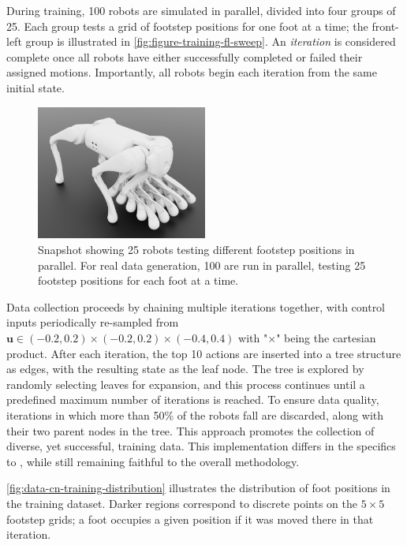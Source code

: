 During training, 100 robots are simulated in parallel, divided into
four groups of 25. Each group tests a grid of footstep positions for
one foot at a time; the front-left group is illustrated in
\autoref{fig:figure-training-fl-sweep}. An \textit{iteration} is
considered complete once all robots have either successfully
completed or failed their assigned motions. Importantly, all robots
begin each iteration from the same initial state.

\begin{figure}[H]
  \centering
  \includegraphics[width=0.5\textwidth]{images/figures/training-fl-sweep.png}
  \caption{Snapshot showing 25 robots testing different footstep
    positions in parallel. For real data generation, 100 are run in
  parallel, testing 25 footstep positions for each foot at a time.}
  \label{fig:figure-training-fl-sweep}
\end{figure}

Data collection proceeds by chaining multiple iterations together,
with control inputs periodically re-sampled from  $\mathbf u \in
(-0.2, 0.2) \times (-0.2, 0.2) \times (-0.4, 0.4)$ with "$\times$"
being the cartesian product.  After each iteration, the top 10
actions are inserted into a tree structure as edges, with the
resulting state as the leaf node. The tree is explored by randomly
selecting leaves for expansion, and this process continues until a
predefined maximum number of iterations is reached. To ensure data
quality, iterations in which more than 50\% of the robots fall are
discarded, along with their two parent nodes in the tree. This
approach promotes the collection of diverse, yet successful, training
data. This implementation differs in the specifics to
\cite{bratta_contactnet_2024}, while still remaining faithful
to the overall methodology.

\autoref{fig:data-cn-training-distribution} illustrates the
distribution of foot positions in the training dataset. Darker
regions correspond to discrete points on the $5 \times 5$ footstep
grids; a foot occupies a given position if it was moved there in that iteration.

